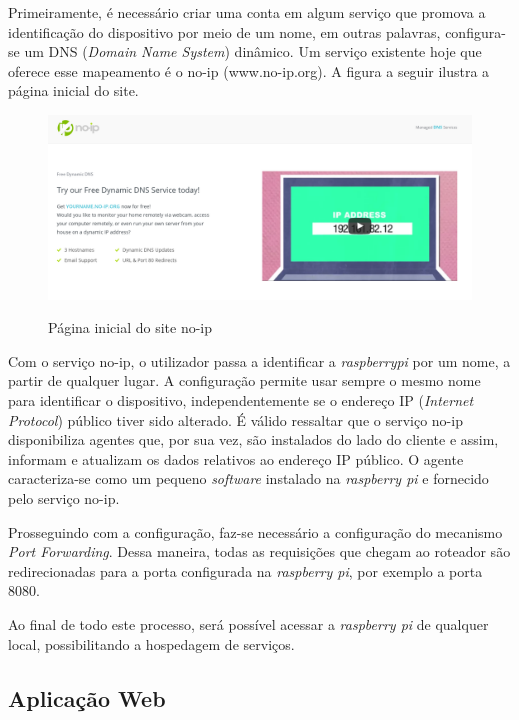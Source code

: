 Primeiramente, é necessário criar uma conta em algum serviço que promova a identificação do dispositivo por meio de um nome, em outras palavras, configura-se um DNS (\textit{Domain Name System}) dinâmico. Um serviço existente hoje que oferece esse mapeamento é o no-ip (www.no-ip.org). A figura a seguir ilustra a página inicial do site.

\begin{figure}[H]
\centering
\includegraphics[keepaspectratio=true,scale=0.35]{figuras/sitenoip.png}
\label{fig:site_no_ip}
\caption{Página inicial do site no-ip}
\end{figure}

Com o serviço no-ip, o utilizador passa a identificar a \textit{raspberrypi} por um nome, a partir de qualquer lugar. A configuração permite usar sempre o mesmo nome para identificar o dispositivo, independentemente se o endereço IP (\textit{Internet Protocol}) público tiver sido alterado. É válido ressaltar que o serviço no-ip disponibiliza agentes que, por sua vez, são instalados do lado do cliente e assim, informam e atualizam os dados relativos ao endereço IP público. O agente caracteriza-se como um pequeno \textit{software} instalado na \textit{raspberry pi} e fornecido pelo serviço no-ip.

Prosseguindo com a configuração, faz-se necessário a configuração do mecanismo \textit{Port Forwarding}. Dessa maneira, todas as requisições que chegam ao roteador são redirecionadas para a porta configurada na \textit{raspberry pi}, por exemplo a porta 8080.

Ao final de todo este processo, será possível acessar a \textit{raspberry pi} de qualquer local, possibilitando a hospedagem de serviços.

\subsection{Aplicação Web}

